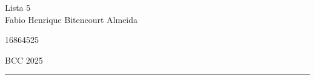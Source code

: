 \documentclass[12pt,letterpaper, onecolumn]{exam}
\begin{document}
\begingroup  
    \centering
    \LARGE Lista 5\\
    \large Fabio Henrique Bitencourt Almeida\par
    \large 16864525\par
    \large BCC 2025\par
\endgroup
\rule{\textwidth}{0.4pt}


\pointsdroppedatright %


\printanswers
\renewcommand{\solutiontitle}{\noindent\textbf{Respostas}\enspace}   %

\pagestyle{empty}

\begin{questions}

\question[123] \droppoints 
\begin{solution}
    
\end{solution}

\end{questions}
\end{document}
